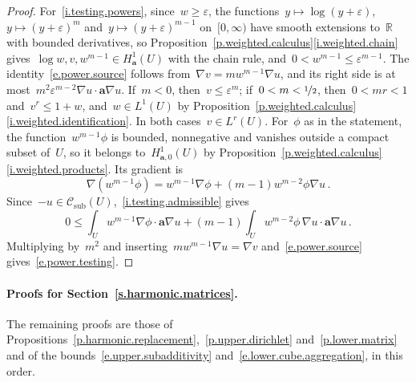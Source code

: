 \documentclass[11pt,letterpaper]{article}
\numberwithin{equation}{section}
\theoremstyle{definition}
\newcommand{\R}{\mathbb{R}}
\renewcommand{\a}{\mathbf{a}}
\newcommand{\eps}{\varepsilon}
\newcommand{\nf}{\nicefrac}
\newcommand{\Hzero}[1]{H^1_{#1,0}}
\newcommand{\Csub}{\mathcal C_{\mathrm{sub}}}
\begin{document}
\begin{proof}
For~\ref{i.testing.powers}, since~$w\geq\eps$, the functions~$y\mapsto\log(y+\eps)$,~$y\mapsto(y+\eps)^m$ and~$y\mapsto(y+\eps)^{m-1}$ on~$[0,\infty)$ have smooth extensions to~$\R$ with bounded derivatives, so Proposition~\ref{p.weighted.calculus}\ref{i.weighted.chain} gives~$\log w,v,w^{m-1}\in H^1_\a(U)$ with the chain rule, and~$0<w^{m-1}\leq\eps^{m-1}$. The identity~\eqref{e.power.source} follows from~$\nabla v=mw^{m-1}\nabla u$, and its right side is at most~$m^2\eps^{m-2}\nabla u\cdot\a\nabla u$. If~$m<0$, then~$v\leq\eps^m$; if~$0<m<\nf12$, then~$0<mr<1$ and~$v^r\leq1+w$, and~$w\in L^1(U)$ by Proposition~\ref{p.weighted.calculus}\ref{i.weighted.identification}. In both cases~$v\in L^r(U)$. For~$\phi$ as in the statement, the function~$w^{m-1}\phi$ is bounded, nonnegative and vanishes outside a compact subset of~$U$, so it belongs to~$\Hzero{\a}(U)$ by Proposition~\ref{p.weighted.calculus}\ref{i.weighted.products}. Its gradient is
\begin{equation*}
	\nabla(w^{m-1}\phi)=w^{m-1}\nabla\phi+(m-1)w^{m-2}\phi\nabla u\,.
\end{equation*}
Since~$-u\in\Csub(U)$,~\ref{i.testing.admissible} gives
\begin{equation*}
	0\leq\int_Uw^{m-1}\nabla\phi\cdot\a\nabla u+(m-1)\int_Uw^{m-2}\phi\,\nabla u\cdot\a\nabla u\,.
\end{equation*}
Multiplying by~$m^2$ and inserting~$mw^{m-1}\nabla u=\nabla v$ and~\eqref{e.power.source} gives~\eqref{e.power.testing}.
\end{proof}

\paragraph{Proofs for Section~\ref{s.harmonic.matrices}.} The remaining proofs are those of Propositions~\ref{p.harmonic.replacement},~\ref{p.upper.dirichlet} and~\ref{p.lower.matrix} and of the bounds~\eqref{e.upper.subadditivity} and~\eqref{e.lower.cube.aggregation}, in this order.
\end{document}
